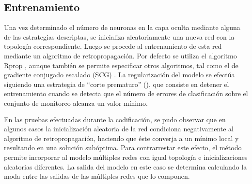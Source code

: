 %
\subsection{Entrenamiento}
%
Una vez determinado el número de neuronas en la capa oculta mediante
alguna de las estrategias descriptas, se inicializa aleatoriamente una
nueva red con la topología correspondiente.
Luego se procede al entrenamiento de esta red mediante un algoritmo de
retropropagación.
Por defecto se utiliza el algoritmo {Rprop} \cite{rprop}, aunque
también se permite especificar otros algoritmos, tal como el de
gradiente conjugado escalado (SCG) \cite{scg}.
La regularización del modelo se efectúa siguiendo una estrategia de
``corte prematuro'' (), que consiste en detener el
entrenamiento cuando se detecta que el número de errores de
clasificación sobre el conjunto de monitoreo alcanza un valor
mínimo.

En las pruebas efectuadas durante la codificación, se pudo observar
que en algunos casos la inicialización aleatoria de la red condiciona
negativamente al algoritmo de retropropagación, haciendo que éste
converja a un mínimo local y resultando en una solución subóptima.
Para contrarrestar este efecto, el método permite incorporar al modelo
múltiples redes con igual topología e inicializaciones aleatorias
diferentes.
La salida del modelo en este caso se determina calculando la moda
entre las salidas de las múltiples redes que lo componen.
